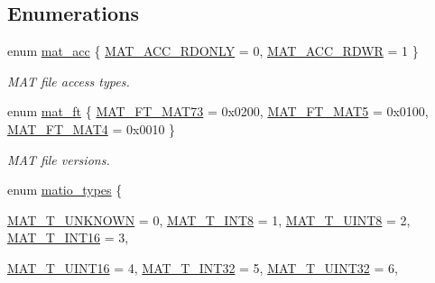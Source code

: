 \subsection*{Enumerations}
\begin{DoxyCompactItemize}
\item 
enum \hyperlink{group__MAT_gaa9dcbc70f538af79bd557593ff6b5cdb}{mat\_\-acc} \{ \hyperlink{group__MAT_ggaa9dcbc70f538af79bd557593ff6b5cdba8dd1457651b27ba9bea6cfba158c037c}{MAT\_\-ACC\_\-RDONLY} =  0, 
\hyperlink{group__MAT_ggaa9dcbc70f538af79bd557593ff6b5cdba0f65f27ea42fde32d62b702b82329c1f}{MAT\_\-ACC\_\-RDWR} =  1
 \}
\begin{DoxyCompactList}\small\item\em MAT file access types. \item\end{DoxyCompactList}\item 
enum \hyperlink{group__MAT_gad03442b8378999189d510e3745c702b7}{mat\_\-ft} \{ \hyperlink{group__MAT_ggad03442b8378999189d510e3745c702b7a765c5d1d5038947646260dc82483517e}{MAT\_\-FT\_\-MAT73} =  0x0200, 
\hyperlink{group__MAT_ggad03442b8378999189d510e3745c702b7a31ade1f6989411dc0299007e2c7d33b2}{MAT\_\-FT\_\-MAT5} =  0x0100, 
\hyperlink{group__MAT_ggad03442b8378999189d510e3745c702b7a858b4f5da65548219b1c3ad47aa478d3}{MAT\_\-FT\_\-MAT4} =  0x0010
 \}
\begin{DoxyCompactList}\small\item\em MAT file versions. \item\end{DoxyCompactList}\item 
enum \hyperlink{group__MAT_gacf7b3b879282b7ab3a51190e49bf3453}{matio\_\-types} \{ \par
\hyperlink{group__MAT_ggacf7b3b879282b7ab3a51190e49bf3453a2a7318fe8bf9464935e7ed8902618293}{MAT\_\-T\_\-UNKNOWN} =  0, 
\hyperlink{group__MAT_ggacf7b3b879282b7ab3a51190e49bf3453a9807f5033ed4f9b548953742d9fd1658}{MAT\_\-T\_\-INT8} =  1, 
\hyperlink{group__MAT_ggacf7b3b879282b7ab3a51190e49bf3453a01c1bd7db68f90552862eb5d311be408}{MAT\_\-T\_\-UINT8} =  2, 
\hyperlink{group__MAT_ggacf7b3b879282b7ab3a51190e49bf3453a8c5b2e381946e95ea8d81ac216743302}{MAT\_\-T\_\-INT16} =  3, 
\par
\hyperlink{group__MAT_ggacf7b3b879282b7ab3a51190e49bf3453a05bc7af7680aa68be95126ae0a4c2e31}{MAT\_\-T\_\-UINT16} =  4, 
\hyperlink{group__MAT_ggacf7b3b879282b7ab3a51190e49bf3453a83e06a68320726c6572bfbb9f3addb1d}{MAT\_\-T\_\-INT32} =  5, 
\hyperlink{group__MAT_ggacf7b3b879282b7ab3a51190e49bf3453aa397e285a23fe240368b752897652c6a}{MAT\_\-T\_\-UINT32} =  6, 

\end{DoxyCompactItemize}
